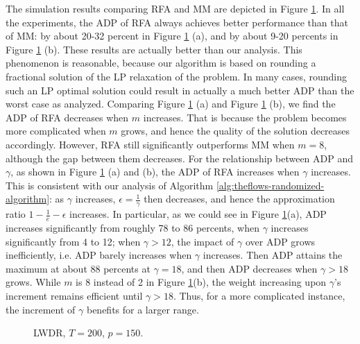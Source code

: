 \documentclass[11pt,english,onecolumn,draftcls]{IEEEtran}
\theoremstyle{plain}
\theoremstyle{plain}
\theoremstyle{plain}
\theoremstyle{plain}
\begin{document}
The simulation results comparing RFA and MM are depicted in Figure
\ref{fig:gamma}. In all the experiments, the ADP of RFA always achieves
better performance than that of MM: by about 20-32 percent in Figure
\ref{fig:gamma} (a), and by about 9-20 percents in Figure \ref{fig:gamma}
(b). These results are actually better than our analysis. This phenomenon
is reasonable, because our algorithm is based on rounding a fractional
solution of the LP relaxation of the problem. In many cases, rounding
such an LP optimal solution could result in actually a much better
ADP than the worst case as analyzed. Comparing Figure \ref{fig:gamma}
(a) and Figure \ref{fig:gamma} (b), we find the ADP of RFA decreases
when $m$ increases. That is because the problem becomes more complicated
when $m$ grows, and hence the quality of the solution decreases accordingly.
However, RFA still significantly outperforms MM when $m=8$, although
the gap between them decreases. For the relationship between ADP and
$\gamma$, as shown in Figure \ref{fig:gamma} (a) and (b), the ADP
of RFA increases when $\gamma$ increases. This is consistent with
our analysis of Algorithm \ref{alg:theflows-randomized-algorithm}:
as $\gamma$ increases, $\epsilon=\frac{1}{\gamma}$ then decreases,
and hence the approximation ratio $1-\frac{1}{e}-\epsilon$ increases.
In particular, as we could see in Figure \ref{fig:gamma}(a), ADP
increases significantly from roughly 78 to 86 percents, when $\gamma$
increases significantly from 4 to 12; when $\gamma>12$, the impact
of $\gamma$ over ADP grows inefficiently, i.e. ADP barely increases
when $\gamma$ increases. Then ADP attains the maximum at about 88
percents at $\gamma=18$, and then ADP decreases when $\gamma>18$
grows. While $m$ is 8 instead of 2 in Figure \ref{fig:gamma}(b),
the weight increasing upon $\gamma$'s increment remains efficient
until $\gamma>18$. Thus, for a more complicated instance, the increment
of $\gamma$ benefits for a larger range.

\begin{figure}
\subfloat[$m=2$, n=400, $\gamma=2,\,\dots,\,22$.]{\texttt{[image: m2mm]}

} 

\protect\caption{\label{fig:gamma}LWDR, $T=200$, $p=150$. }
\end{figure}
\end{document}
